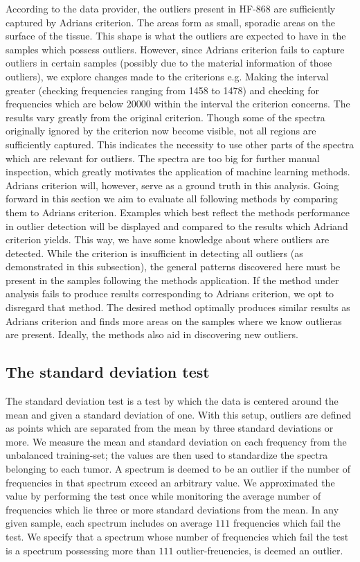 According to the data provider, the outliers present in HF-868 are sufficiently captured by Adrians criterion. The areas form as small, sporadic areas on the surface of the tissue. This shape is what the outliers are expected to have in the samples which possess outliers. However, since Adrians criterion fails to capture outliers in certain samples (possibly due to the material information of those outliers), we explore changes made to the criterions e.g. Making the interval greater (checking frequencies ranging from 1458 to 1478) and checking for frequencies which are below $20000$ within the interval the criterion concerns. The results vary greatly from the original criterion. Though some of the spectra originally ignored by the criterion now become visible, not all regions are sufficiently captured. This indicates the necessity to use other parts of the spectra which are relevant for outliers. The spectra are too big for further manual inspection, which greatly motivates the application of machine learning methods. Adrians criterion will, however, serve as a ground truth in this analysis. Going forward in this section we aim to evaluate all following methods by comparing them to Adrians criterion. Examples which best reflect the methods performance in outlier detection will be displayed and compared to the results which Adriand criterion yields. This way, we have some knowledge about where outliers are detected. While the criterion is insufficient in detecting all  outliers (as demonstrated in this subsection), the general patterns discovered here must be present in the samples following the methods application. If the method under analysis fails to produce results corresponding to Adrians criterion, we opt to disregard that method. The desired method optimally produces similar results as Adrians criterion and finds more areas on the samples where we know outlieras are present. Ideally, the methods also aid in discovering new outliers.

\subsection{The standard deviation test}

The standard deviation test is a test by which the data is centered around the mean and given a standard deviation of one. With this setup, outliers are defined as points which are separated from the mean by three standard deviations or more. We measure the mean and standard deviation on each frequency from the unbalanced training-set; the values are then used to standardize the spectra belonging to each tumor. A spectrum is deemed to be an outlier if the number of frequencies in that spectrum exceed an arbitrary value. We approximated the value by performing the test once while monitoring the average number of frequencies which lie three or more standard deviations from the mean. In any given sample, each spectrum includes on average $111$ frequencies which fail the test. We specify that a spectrum whose number of frequencies which fail the test is a spectrum possessing more than $111$ outlier-freuencies, is deemed an outlier. 

